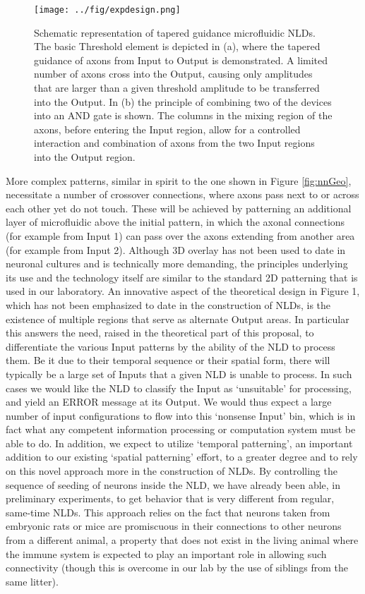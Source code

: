 \begin{figure}
\begin{center}
\texttt{[image: ../fig/expdesign.png]}
\caption{Schematic representation of tapered guidance microfluidic NLDs. The basic Threshold element is depicted in (a), where the tapered guidance of axons from Input to Output is demonstrated. A limited number of axons cross into the Output, causing only amplitudes that are larger than a given threshold amplitude to be transferred into the Output. In (b) the principle of combining two of the devices into an AND gate is shown. The columns in the mixing region of the axons, before entering the Input region, allow for a controlled interaction and combination of axons from the two Input regions into the Output region.}\label{fig:expdesign}
\end{center}
\end{figure}

More complex patterns, similar in spirit to the one shown in Figure \ref{fig:nnGeo}, necessitate a number of crossover connections, where axons pass next to or across each other yet do not touch. These will be achieved by patterning an additional layer of microfluidic above the initial pattern, in which the axonal connections (for example from Input 1) can pass over the axons extending from another area (for example from Input 2). Although 3D overlay has not been used to date in neuronal cultures and is technically more demanding, the principles underlying its use and the technology \cite{Rotem2012} itself are similar to the standard 2D patterning that is used in our laboratory.
An innovative aspect of the theoretical design in Figure 1, which has not been emphasized to date in the construction of NLDs, is the existence of multiple regions that serve as alternate Output areas. In particular this answers the need, raised in the theoretical part of this proposal, to differentiate the various Input patterns by the ability of the NLD to process them. Be it due to their temporal sequence or their spatial form, there will typically be a large set of Inputs that a given NLD is unable to process. In such cases we would like the NLD to classify the Input as ‘unsuitable’ for processing, and yield an ERROR message at its Output. We would thus expect a large number of input configurations to flow into this ‘nonsense Input’ bin, which is in fact what any competent information processing or computation system must be able to do.
In addition, we expect to utilize ‘temporal patterning’, an important addition to our existing ‘spatial patterning’ effort, to a greater degree and to rely on this novel approach more in the construction of NLDs. By controlling the sequence of seeding of neurons inside the NLD, we have already been able, in preliminary experiments, to get behavior that is very different from regular, same-time NLDs. This approach relies on the fact that neurons taken from embryonic rats or mice are promiscuous in their connections to other neurons from a different animal, a property that does not exist in the living animal where the immune system is expected to play an important role in allowing such connectivity (though this is overcome in our lab by the use of siblings from the same litter).

